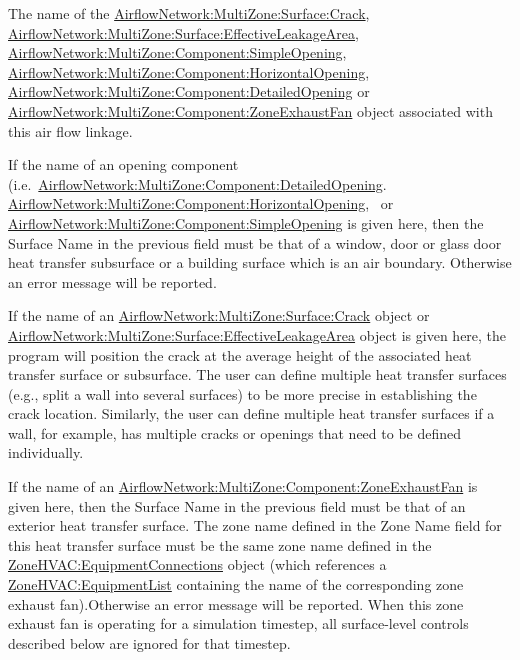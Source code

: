 The name of the \hyperref[airflownetworkmultizonesurfacecrack]{AirflowNetwork:MultiZone:Surface:Crack}, \hyperref[airflownetworkmultizonesurfaceeffectiveleakagearea]{AirflowNetwork:MultiZone:Surface:EffectiveLeakageArea}, \hyperref[airflownetworkmultizonecomponentsimpleopening]{AirflowNetwork:MultiZone:Component:SimpleOpening}, \hyperref[airflownetworkmultizonecomponenthorizontalopening]{AirflowNetwork:MultiZone:Component:HorizontalOpening}, \hyperref[airflownetworkmultizonecomponentdetailedopening]{AirflowNetwork:MultiZone:Component:DetailedOpening} or \hyperref[airflownetworkmultizonecomponentzoneexhaustfan]{AirflowNetwork:MultiZone:Component:ZoneExhaustFan} object associated with this air flow linkage.

If the name of an opening component (i.e.~\hyperref[airflownetworkmultizonecomponentdetailedopening]{AirflowNetwork:MultiZone:Component:DetailedOpening}. \hyperref[airflownetworkmultizonecomponenthorizontalopening]{AirflowNetwork:MultiZone:Component:HorizontalOpening},~ or \hyperref[airflownetworkmultizonecomponentsimpleopening]{AirflowNetwork:MultiZone:Component:SimpleOpening} is given here, then the Surface Name in the previous field must be that of a window, door or glass door heat transfer subsurface or a building surface which is an air boundary. Otherwise an error message will be reported.

If the name of an \hyperref[airflownetworkmultizonesurfacecrack]{AirflowNetwork:MultiZone:Surface:Crack} object or \hyperref[airflownetworkmultizonesurfaceeffectiveleakagearea]{AirflowNetwork:MultiZone:Surface:EffectiveLeakageArea} object is given here, the program will position the crack at the average height of the associated heat transfer surface or subsurface. The user can define multiple heat transfer surfaces (e.g., split a wall into several surfaces) to be more precise in establishing the crack location. Similarly, the user can define multiple heat transfer surfaces if a wall, for example, has multiple cracks or openings that need to be defined individually.

If the name of an \hyperref[airflownetworkmultizonecomponentzoneexhaustfan]{AirflowNetwork:MultiZone:Component:ZoneExhaustFan} is given here, then the Surface Name in the previous field must be that of an exterior heat transfer surface. The zone name defined in the Zone Name field for this heat transfer surface must be the same zone name defined in the \hyperref[zonehvacequipmentconnections]{ZoneHVAC:EquipmentConnections} object (which references a \hyperref[zonehvacequipmentlist]{ZoneHVAC:EquipmentList} containing the name of the corresponding zone exhaust fan).Otherwise an error message will be reported. When this zone exhaust fan is operating for a simulation timestep, all surface-level controls described below are ignored for that timestep.

